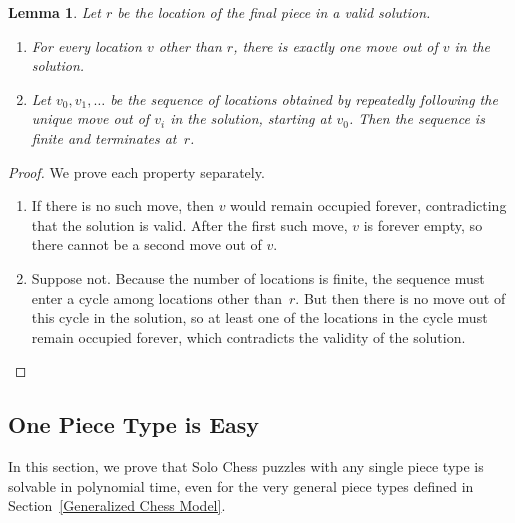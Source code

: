 \documentclass[11pt,letterpaper]{article}
\theoremstyle{plain}
\newtheorem{lemma}[theorem]{Lemma}
\theoremstyle{definition}
\theoremstyle{remark}
\numberwithin{equation}{section}
\begin{document}
\begin{lemma}
  \label{lem:solution-no-cycle}
  Let $r$ be the location of the final piece in a valid solution.
  \begin{enumerate}
  \item For every location $v$ other than $r$, there is exactly one move out of $v$ in the solution.
  \item 
    Let $v_0, v_1, \dots$ be the sequence of locations obtained by repeatedly following the unique move out of $v_i$ in the solution, starting at $v_0$.
    Then the sequence is finite and terminates at~$r$.
  \end{enumerate}
\end{lemma}
\begin{proof}
  We prove each property separately.
  \begin{enumerate}
  \item If there is no such move, then $v$ would remain occupied forever,
    contradicting that the solution is valid.
    After the first such move, $v$ is forever empty,
    so there cannot be a second move out of $v$.
  \item 
    Suppose not.
    Because the number of locations is finite,
    the sequence must enter a cycle among locations other than~$r$.
    But then there is no move out of this cycle in the solution,
    so at least one of the locations in the cycle must remain occupied forever,
    which contradicts the validity of the solution.
    \qedhere
  \end{enumerate}
\end{proof}

\subsection{One Piece Type is Easy}
\label{sec:onepieceeasy}

In this section, we prove that Solo Chess puzzles with any single piece type
is solvable in polynomial time, even for the very general piece types
defined in Section~\ref{Generalized Chess Model}.
\end{document}
